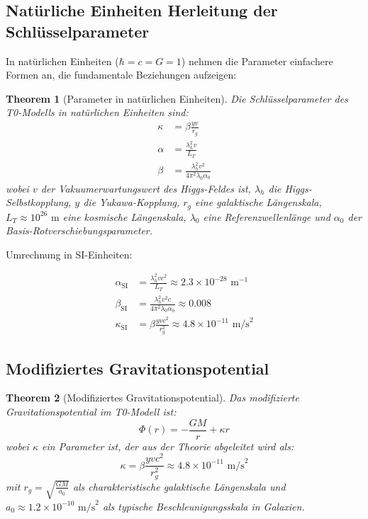 \documentclass[a4paper,12pt]{article}
\newtheorem{theorem}{Theorem}[section]
\theoremstyle{definition}
\theoremstyle{remark}
\begin{document}
	\subsection{Natürliche Einheiten Herleitung der Schlüsselparameter}
	
	In natürlichen Einheiten ($\hbar = c = G = 1$) nehmen die Parameter einfachere Formen an, die fundamentale Beziehungen aufzeigen:
	
	\begin{theorem}[Parameter in natürlichen Einheiten]
		Die Schlüsselparameter des T0-Modells in natürlichen Einheiten sind:
		\begin{align}
			\kappa &= \beta \frac{y v}{r_g} \\
			\alpha &= \frac{\lambda_h^2 v}{L_T} \\
			\beta &= \frac{\lambda_h^2 v^2}{4\pi^2 \lambda_0 \alpha_0}
		\end{align}
		wobei $v$ der Vakuumerwartungswert des Higgs-Feldes ist, $\lambda_h$ die Higgs-Selbstkopplung, $y$ die Yukawa-Kopplung, $r_g$ eine galaktische Längenskala, $L_T \approx 10^{26} \text{ m}$ eine kosmische Längenskala, $\lambda_0$ eine Referenzwellenlänge und $\alpha_0$ der Basis-Rotverschiebungsparameter.
	\end{theorem}
	
	Umrechnung in SI-Einheiten:
	
	\begin{align}
		\alpha_{\text{SI}} &= \frac{\lambda_h^2 v c^2}{L_T} \approx 2.3 \times 10^{-28} \text{ m}^{-1} \\
		\beta_{\text{SI}} &= \frac{\lambda_h^2 v^2 c}{4\pi^2 \lambda_0 \alpha_0} \approx 0.008 \\
		\kappa_{\text{SI}} &= \beta \frac{y v c^2}{r_g^2} \approx 4.8 \times 10^{-11} \text{ m/s}^2
	\end{align}
	
	\subsection{Modifiziertes Gravitationspotential}
	
	\begin{theorem}[Modifiziertes Gravitationspotential]
		Das modifizierte Gravitationspotential im T0-Modell ist:
		\begin{equation}
			\Phi(r) = -\frac{GM}{r} + \kappa r
		\end{equation}
		wobei $\kappa$ ein Parameter ist, der aus der Theorie abgeleitet wird als:
		\begin{equation}
			\kappa = \beta \frac{y v c^2}{r_g^2} \approx 4.8 \times 10^{-11} \text{ m/s}^2
		\end{equation}
		mit $r_g = \sqrt{\frac{GM}{a_0}}$ als charakteristische galaktische Längenskala und $a_0 \approx 1.2 \times 10^{-10} \text{ m/s}^2$ als typische Beschleunigungsskala in Galaxien.
	\end{theorem}
	
\end{document}
